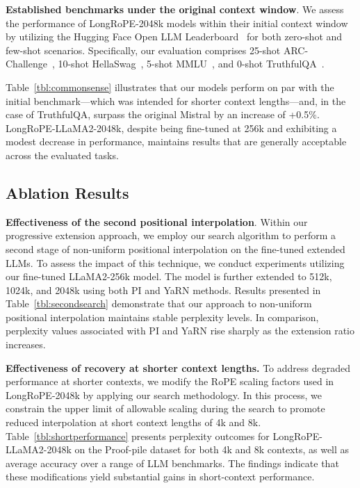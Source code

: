 \textbf{Established benchmarks under the original context window}. We assess the performance of LongRoPE-2048k models within their initial context window by utilizing the Hugging Face Open LLM Leaderboard~\cite{huggingfaceboard} for both zero-shot and few-shot scenarios. Specifically, our evaluation comprises 25-shot ARC-Challenge~\cite{allenai:arc}, 10-shot HellaSwag~\cite{zellers2019hellaswag}, 5-shot MMLU~\cite{mmlu}, and 0-shot TruthfulQA~\cite{lin2021truthfulqa}.

Table~\ref{tbl:commonsense} illustrates that our models perform on par with the initial benchmark—which was intended for shorter context lengths—and, in the case of TruthfulQA, surpass the original Mistral by an increase of +0.5\%. LongRoPE-LLaMA2-2048k, despite being fine-tuned at 256k and exhibiting a modest decrease in performance, maintains results that are generally acceptable across the evaluated tasks.

\subsection{Ablation Results}

\textbf{Effectiveness of the second positional interpolation}. Within our progressive extension approach, we employ our search algorithm to perform a second stage of non-uniform positional interpolation on the fine-tuned extended LLMs. To assess the impact of this technique, we conduct experiments utilizing our fine-tuned LLaMA2-256k model. The model is further extended to 512k, 1024k, and 2048k using both PI and YaRN methods. Results presented in Table~\ref{tbl:secondsearch} demonstrate that our approach to non-uniform positional interpolation maintains stable perplexity levels. In comparison, perplexity values associated with PI and YaRN rise sharply as the extension ratio increases.

\textbf{Effectiveness of recovery at shorter context lengths.} To address degraded performance at shorter contexts, we modify the RoPE scaling factors used in LongRoPE-2048k by applying our search methodology. In this process, we constrain the upper limit of allowable scaling during the search to promote reduced interpolation at short context lengths of 4k and 8k. Table~\ref{tbl:shortperformance} presents perplexity outcomes for LongRoPE-LLaMA2-2048k on the Proof-pile dataset for both 4k and 8k contexts, as well as average accuracy over a range of LLM benchmarks. The findings indicate that these modifications yield substantial gains in short-context performance.


